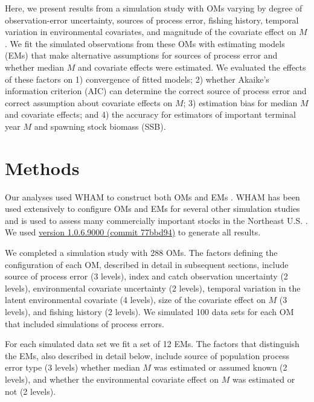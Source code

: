 \documentclass[
  12pt,
]{article}
\begin{document}
Here, we present results from a simulation study with OMs varying by degree of observation-error uncertainty, sources of process error, fishing history, temporal variation in environmental covariates, and magnitude of the covariate effect on \(M\). We fit the simulated observations from these OMs with estimating models (EMs) that make alternative assumptions for sources of process error and whether median \(M\) and covariate effects were estimated. We evaluated the effects of these factors on 1) convergence of fitted models; 2) whether Akaike's information criterion (AIC) can determine the correct source of process error and correct assumption about covariate effects on \(M\); 3) estimation bias for median \(M\) and covariate effects; and 4) the accuracy for estimators of important terminal year \(M\) and spawning stock biomass (SSB).

\section*{Methods}\label{methods}

Our analyses used WHAM to construct both OMs and EMs \citep{millerstock20, stockmiller21, milleretal25}. WHAM has been used extensively to configure OMs and EMs for several other simulation studies \citep{stocketal21, legaultetal23, lietal24, brittenetal26, lietal26_a} and is used to assess many commercially important stocks in the Northeast U.S. \citep[e.g.,][]{nefsc22, nefsc22a, nefsc24}. We used \href{https://github.com/timjmiller/wham/tree/77bbd946e4881216a439933473d1c58b21c270c3}{version 1.0.6.9000 (commit 77bbd94)} to generate all results.

We completed a simulation study with 288 OMs. The factors defining the configuration of each OM, described in detail in subsequent sections, include source of process error (3 levels), index and catch observation uncertainty (2 levels), environmental covariate uncertainty (2 levels), temporal variation in the latent environmental covariate (4 levels), size of the covariate effect on \(M\) (3 levels), and fishing history (2 levels). We simulated 100 data sets for each OM that included simulations of process errors.

For each simulated data set we fit a set of 12 EMs. The factors that distinguish the EMs, also described in detail below, include source of population process error type (3 levels) whether median \(M\) was estimated or assumed known (2 levels), and whether the environmental covariate effect on \(M\) was estimated or not (2 levels).
\end{document}
